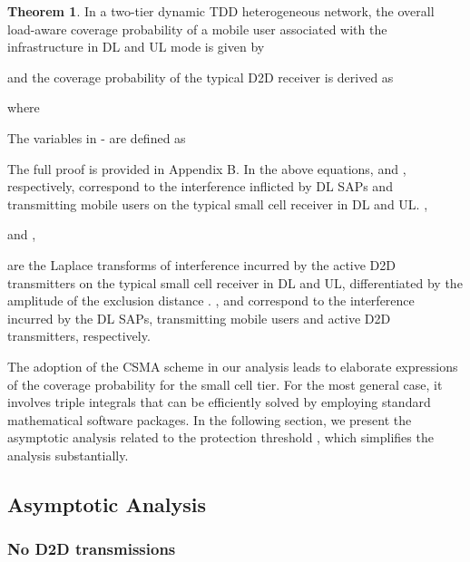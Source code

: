 \documentclass[twocolumn,english]{IEEEtran}
\theoremstyle{plain}
\theoremstyle{definition}
\newtheorem{theorem}{\textbf{Theorem}}
\begin{document}
\begin{theorem}

In a two-tier dynamic TDD heterogeneous network, the overall load-aware
coverage probability of a mobile user associated with the infrastructure
in DL and UL mode is given by

and the coverage probability of the typical D2D receiver is derived
as

where







The variables in -
are defined as






{\small{}




}{\small \par}
\begin{IEEEproof}
The full proof is provided in Appendix B. In the above equations,
 and , respectively, correspond to the
interference inflicted by DL SAPs and transmitting mobile users on
the typical small cell receiver in DL and UL. ,

and ,

are the Laplace transforms of interference incurred by the active
D2D transmitters on the typical small cell receiver in DL and UL,
differentiated by the amplitude of the exclusion distance .
, 
and  correspond to the interference
incurred by the DL SAPs, transmitting mobile users and active D2D
transmitters, respectively.
\end{IEEEproof}
\end{theorem}

The adoption of the CSMA scheme in our analysis leads to elaborate
expressions of the coverage probability for the small cell tier. For
the most general case, it involves triple integrals that can be efficiently
solved by employing standard mathematical software packages. In the
following section, we present the asymptotic analysis related to the
protection threshold , which simplifies the analysis
substantially.


\subsection{Asymptotic Analysis}


\subsubsection{No D2D transmissions}
\end{document}
